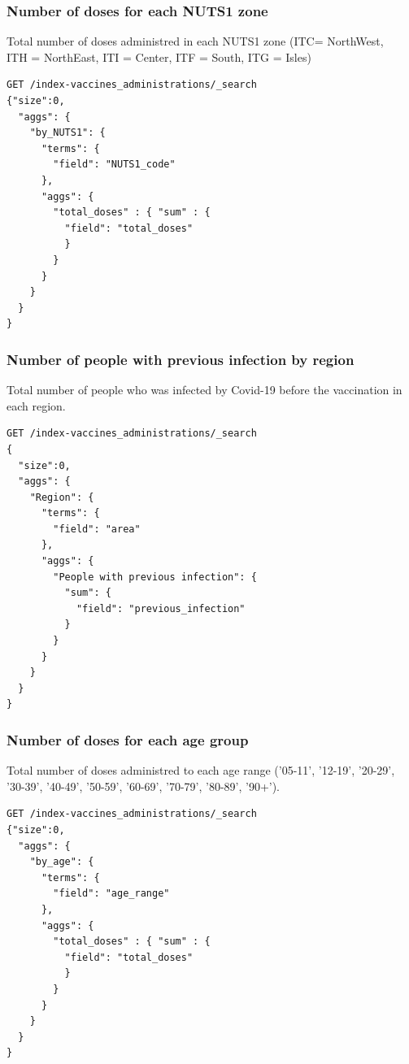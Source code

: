 \documentclass[12pt, a4paper]{article}
\begin{document}
\subsubsection{Number of doses for each NUTS1 zone}
Total number of doses administred in each NUTS1 zone (ITC= NorthWest, \\ 
ITH = NorthEast, ITI = Center, ITF = South, ITG = Isles)
\begin{tcolorbox}[fontupper=\scriptsize]
  \begin{verbatim}
GET /index-vaccines_administrations/_search
{"size":0,
  "aggs": {
    "by_NUTS1": {
      "terms": {
        "field": "NUTS1_code"
      },
      "aggs": {
        "total_doses" : { "sum" : {
          "field": "total_doses"
          }
        }
      }
    }
  }
}
  \end{verbatim}
\end{tcolorbox}

\subsubsection{Number of people with previous infection by region}
Total number of people who was infected by Covid-19 before the vaccination in each 
region.
\begin{tcolorbox}[fontupper=\scriptsize]
  \begin{verbatim}
GET /index-vaccines_administrations/_search
{
  "size":0,
  "aggs": {
    "Region": {
      "terms": {
        "field": "area"
      },
      "aggs": {
        "People with previous infection": {
          "sum": {
            "field": "previous_infection"
          }
        }
      }
    }
  }
}
  \end{verbatim}
\end{tcolorbox}

\subsubsection{Number of doses for each age group}
Total number of doses administred to each age range ('05-11', '12-19', '20-29', '30-39',
'40-49', '50-59', '60-69', '70-79', '80-89', '90+').
\begin{tcolorbox}[fontupper=\scriptsize]
  \begin{verbatim}
GET /index-vaccines_administrations/_search
{"size":0,
  "aggs": {
    "by_age": {
      "terms": {
        "field": "age_range"
      },
      "aggs": {
        "total_doses" : { "sum" : { 
          "field": "total_doses"
          }
        }
      }
    }
  }
}

  \end{verbatim}
\end{tcolorbox}
\end{document}
